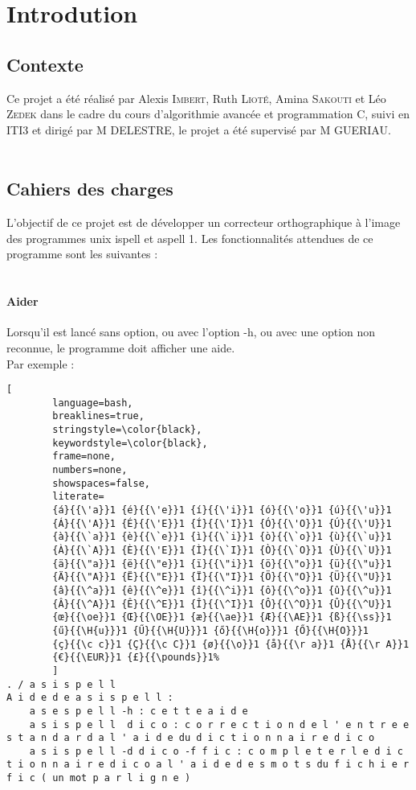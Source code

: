 \section{Introdution}
\subsection{Contexte}
Ce projet a été réalisé par Alexis \textsc{Imbert}, Ruth \textsc{Lioté}, Amina \textsc{Sakouti} et Léo \textsc{Zedek} dans le cadre du cours d'algorithmie avancée et programmation C, suivi en ITI3 et dirigé par M DELESTRE, le projet a été supervisé par M GUERIAU.\\
\\
\subsection{Cahiers des charges}
L'objectif de ce projet est de développer un correcteur orthographique à l'image des programmes unix ispell et aspell 1. Les fonctionnalités attendues de ce programme sont les suivantes :\\
\\
\paragraph{Aider}
Lorsqu'il est lancé sans option, ou avec l'option -h, ou avec une option non reconnue, le programme doit afficher une aide.\\
Par exemple :
\begin{lstlisting}[
		language=bash,
		breaklines=true,
		stringstyle=\color{black},
		keywordstyle=\color{black},
		frame=none,
		numbers=none,
		showspaces=false,
		literate=
		{á}{{\'a}}1 {é}{{\'e}}1 {í}{{\'i}}1 {ó}{{\'o}}1 {ú}{{\'u}}1
		{Á}{{\'A}}1 {É}{{\'E}}1 {Í}{{\'I}}1 {Ó}{{\'O}}1 {Ú}{{\'U}}1
		{à}{{\`a}}1 {è}{{\`e}}1 {ì}{{\`i}}1 {ò}{{\`o}}1 {ù}{{\`u}}1
		{À}{{\`A}}1 {È}{{\'E}}1 {Ì}{{\`I}}1 {Ò}{{\`O}}1 {Ù}{{\`U}}1
		{ä}{{\"a}}1 {ë}{{\"e}}1 {ï}{{\"i}}1 {ö}{{\"o}}1 {ü}{{\"u}}1
		{Ä}{{\"A}}1 {Ë}{{\"E}}1 {Ï}{{\"I}}1 {Ö}{{\"O}}1 {Ü}{{\"U}}1
		{â}{{\^a}}1 {ê}{{\^e}}1 {î}{{\^i}}1 {ô}{{\^o}}1 {û}{{\^u}}1
		{Â}{{\^A}}1 {Ê}{{\^E}}1 {Î}{{\^I}}1 {Ô}{{\^O}}1 {Û}{{\^U}}1
		{œ}{{\oe}}1 {Œ}{{\OE}}1 {æ}{{\ae}}1 {Æ}{{\AE}}1 {ß}{{\ss}}1
		{ű}{{\H{u}}}1 {Ű}{{\H{U}}}1 {ő}{{\H{o}}}1 {Ő}{{\H{O}}}1
		{ç}{{\c c}}1 {Ç}{{\c C}}1 {ø}{{\o}}1 {å}{{\r a}}1 {Å}{{\r A}}1
		{€}{{\EUR}}1 {£}{{\pounds}}1%
		]
. / a s i s p e l l
A i d e d e a s i s p e l l :
	a s e s p e l l -h : c e t t e a i d e
	a s i s p e l l	 d i c o : c o r r e c t i o n d e l ' e n t r e e s t a n d a r d a l ' a i d e du d i c t i o n n a i r e d i c o
	a s i s p e l l -d d i c o -f f i c : c o m p l e t e r l e d i c t i o n n a i r e d i c o a l ' a i d e d e s m o t s du f i c h i e r f i c ( un mot p a r l i g n e )
\end{lstlisting}

